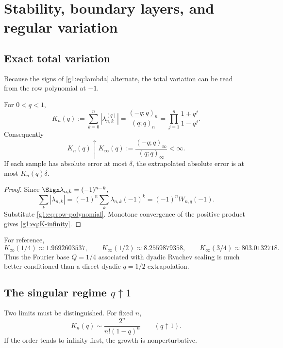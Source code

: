 \section{Stability, boundary layers, and regular variation}
\label{g1:sec:stability}

\subsection{Exact total variation}

Because the signs of \eqref{g1:eq:lambda} alternate, the total variation can be
read from the row polynomial at $-1$.

\begin{theorem}
\label{g1:thm:row-norm}
For $0<q<1$,
\begin{equation}
 K_n(q):=\sum_{k=0}^n|\lambda_{n,k}^{(q)}|
 =\frac{(-q;q)_n}{(q;q)_n}
 =\prod_{j=1}^n\frac{1+q^j}{1-q^j}.
 \label{g1:eq:K-n}
\end{equation}
Consequently
\begin{equation}
 K_n(q)\uparrow K_\infty(q):=\frac{(-q;q)_\infty}{(q;q)_\infty}<\infty.
 \label{g1:eq:K-infinity}
\end{equation}
If each sample has absolute error at most $\delta$, the extrapolated absolute
error is at most $K_n(q)\delta$.
\end{theorem}

\begin{proof}
Since
$\Sign\lambda_{n,k}=(-1)^{n-k}$,
\[
 \sum_k|\lambda_{n,k}|=(-1)^n\sum_k\lambda_{n,k}(-1)^k
 =(-1)^nW_{n,q}(-1).
\]
Substitute \eqref{g1:eq:row-polynomial}.  Monotone convergence of the positive
product gives \eqref{g1:eq:K-infinity}.
\end{proof}

For reference,
\[
 K_\infty(1/4)\approx1.9692603537,
 \qquad K_\infty(1/2)\approx8.2559879358,
 \qquad K_\infty(3/4)\approx803.0132718.
\]
Thus the Fourier base $Q=1/4$ associated with dyadic Rvachev scaling is much
better conditioned than a direct dyadic $q=1/2$ extrapolation.

\subsection{The singular regime $q\uparrow1$}

Two limits must be distinguished.  For fixed $n$,
\begin{equation}
 K_n(q)\sim\frac{2^n}{n!(1-q)^n}
 \qquad(q\uparrow1).
 \label{g1:eq:fixed-n-q1}
\end{equation}
If the order tends to infinity first, the growth is nonperturbative.

